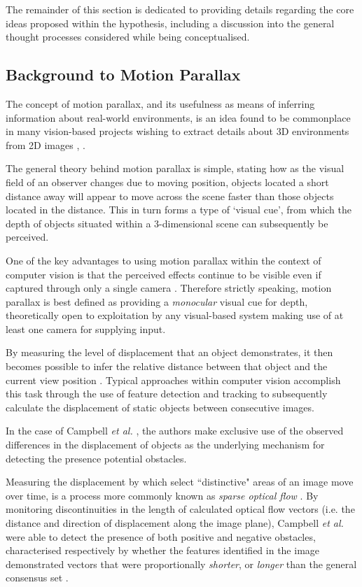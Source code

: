 The remainder of this section is dedicated to providing details regarding the core ideas proposed within the hypothesis, including a discussion into the general thought processes considered while being conceptualised.

\subsection{Background to Motion Parallax}

The concept of motion parallax, and its usefulness as means of inferring information about real-world environments, is an idea found to be commonplace in many vision-based projects wishing to extract details about 3D environments from 2D images \cite{}, \cite{}.  

The general theory behind motion parallax is simple, stating how as the visual field of an observer changes due to moving position, objects located a short distance away will appear to move across the scene faster than those objects located in the distance. This in turn forms a type of `visual cue', from which the depth of objects situated within a 3-dimensional scene can subsequently be perceived.

One of the key advantages to using motion parallax within the context of computer vision is that the perceived effects continue to be visible even if captured through only a single camera \cite{}. Therefore strictly speaking, motion parallax is best defined as providing a \textit{monocular} visual cue for depth, theoretically open to exploitation by any visual-based system making use of at least one camera for supplying input.
 
 By measuring the level of displacement that an object demonstrates, it then becomes possible to infer the relative distance between that object and the current view position \cite{}. Typical approaches within computer vision accomplish this task through the use of feature detection and tracking to subsequently calculate the displacement of static objects between consecutive images. 

In the case of Campbell \textit{et al.} \cite{campbell}, the authors make exclusive use of the observed differences in the displacement of objects as the underlying mechanism for  detecting the presence potential obstacles. 

Measuring the displacement by which select ``distinctive" areas of an image move over time, is a process more commonly known as \textit{sparse optical flow} \cite{sparse-optical-flow}. By monitoring discontinuities in the length of calculated optical flow vectors (i.e. the distance and direction of displacement along the image plane), Campbell \textit{et al.} were able to detect the presence of both positive and negative obstacles, characterised respectively by whether the features identified in the image demonstrated vectors that were proportionally \textit{shorter}, or \textit{longer} than the general consensus set \cite{campbell}.

